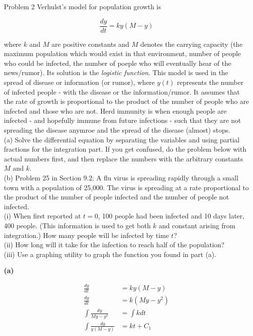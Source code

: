 \documentclass{article}
\begin{document}
    \begin{tbhtheorem}{Problem 2}
        Verhulst's model for population growth is

        \[
            \frac{dy}{dt} = ky(M-y)
        \]

        where $k$ and $M$ are positive constants and $M$ denotes the carrying capacity (the maximum population which would exist in that environment, number of people who could be infected, the number of poeple who will
        eventually hear of the news/rumor). Its solution is the \textit{logistic function}. This model is used in the spread of disease or information (or rumor), where $y(t)$ represents the number of infected people -
        with the disease or the information/rumor. It assumes that the rate of growth is proportional to the product of the number of people who are infected and those who are not. Herd immunity is when enough people
        are infected - and hopefully immune from future infections - such that they are not spreading the disease anymroe and the spread of the disease (almost) stops. \\

        (a) Solve the differential equation by separating the variables and using partial fractions for the integration part. If you get confused, do the problem below with actual numbers first, and then replace the
        numbers with the arbitrary constants $M$ and $k$. \\

        (b) Problem 25 in Section 9.2: A flu virus is spreading rapidly through a small town with a population of 25,000. The virus is spreading at a rate proportional to the product of the number of people infected and
        the number of people not infected. \\
        (i) When first reported at $t=0$, 100 people had been infected and 10 days later, 400 people. (This information is used to get both $k$ and constant arising from integration.) How many people will be infected by
        time $t$? \\
        (ii) How long will it take for the infection to reach half of the population? \\
        (iii) Use a graphing utility to graph the function you found in part (a).
    \end{tbhtheorem}

    \textbf{(a)}

    \begin{align*}
        \frac{dy}{dt}           &= ky(M-y) \\
        \frac{dy}{dt}           &= k(My-y^2) \\
        \int \frac{dy}{My-y^2}  &= \int k dt \\
        \int \frac{dy}{y(M-y)}  &= kt + C_1
    \end{align*}
\end{document}
